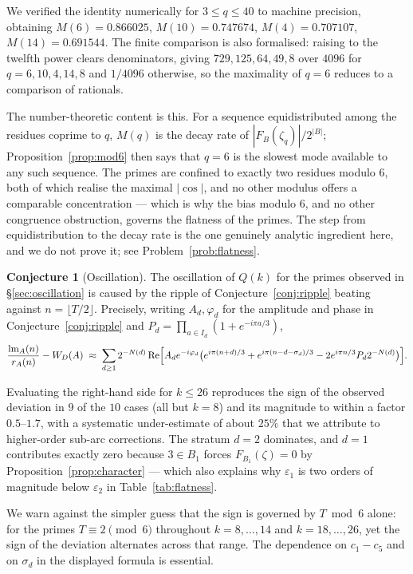 \documentclass[11pt,a4paper]{article}
\theoremstyle{plain}
\theoremstyle{definition}
\newtheorem{conjecture}[theorem]{Conjecture}
\theoremstyle{remark}
\DeclareMathOperator{\lm}{lm}
\begin{document}
We verified the identity numerically for $3\le q\le40$ to machine precision,
obtaining $M(6)=0.866025$, $M(10)=0.747674$, $M(4)=0.707107$,
$M(14)=0.691544$. The finite comparison is also formalised: raising to the
twelfth power clears denominators, giving $729,125,64,49,8$ over $4096$ for
$q=6,10,4,14,8$ and $1/4096$ otherwise, so the maximality of $q=6$ reduces to a
comparison of rationals.

The number-theoretic content is this. For a sequence equidistributed among the
residues coprime to $q$, $M(q)$ is the decay rate of $|F_B(\zeta_q)|/2^{|B|}$;
Proposition~\ref{prop:mod6} then says that $q=6$ is the slowest mode available
to any such sequence. The primes are confined to exactly two residues modulo
$6$, both of which realise the maximal $|\cos|$, and no other modulus offers a
comparable concentration --- which is why the bias modulo $6$, and no other
congruence obstruction, governs the flatness of the primes. The step from
equidistribution to the decay rate is the one genuinely analytic ingredient
here, and we do not prove it; see Problem~\ref{prob:flatness}.

\begin{conjecture}[Oscillation]\label{conj:oscillation}
The oscillation of $Q(k)$ for the primes observed in \S\ref{sec:oscillation} is
caused by the ripple of Conjecture~\ref{conj:ripple} beating against
$n=\lfloor T/2\rfloor$. Precisely, writing $A_d,\varphi_d$ for the amplitude and
phase in Conjecture~\ref{conj:ripple} and
$P_d=\prod_{a\in I_d}(1+e^{-i\pi a/3})$,
\[
  \frac{\lm_A(n)}{r_A(n)}-W_D(A)\;\approx\;
  \sum_{d\ge1}2^{-N(d)}\,\mathrm{Re}\Bigl[A_de^{-i\varphi_d}
  \bigl(e^{i\pi(n+d)/3}+e^{i\pi(n-d-\sigma_d)/3}
        -2e^{i\pi n/3}P_d2^{-N(d)}\bigr)\Bigr].
\]
\end{conjecture}

Evaluating the right-hand side for $k\le26$ reproduces the sign of the observed
deviation in $9$ of the $10$ cases (all but $k=8$) and its magnitude to within a
factor $0.5$--$1.7$, with a systematic under-estimate of about $25\%$ that we
attribute to higher-order sub-arc corrections. The stratum $d=2$ dominates, and
$d=1$ contributes exactly zero because $3\in B_1$ forces $F_{B_1}(\zeta)=0$ by
Proposition~\ref{prop:character} --- which also explains why $\varepsilon_1$ is
two orders of magnitude below $\varepsilon_2$ in Table~\ref{tab:flatness}.

We warn against the simpler guess that the sign is governed by $T\bmod6$ alone:
for the primes $T\equiv2\pmod6$ throughout $k=8,\dots,14$ and $k=18,\dots,26$,
yet the sign of the deviation alternates across that range. The dependence on
$c_1-c_5$ and on $\sigma_d$ in the displayed formula is essential.
\end{document}
